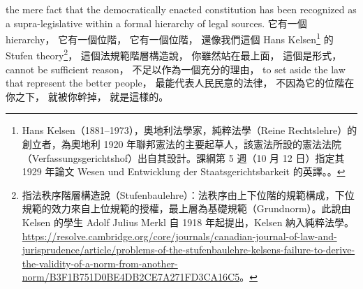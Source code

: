 \hypertarget{w02:cue:1977}{}the mere fact that the democratically enacted constitution has been recognized as a supra-legislative within a formal hierarchy of legal sources.
\hypertarget{w02:cue:1978}{}它有一個 hierarchy，
\hypertarget{w02:cue:1979}{}它有一個位階，
\hypertarget{w02:cue:1980}{}它有一個位階，
\hypertarget{w02:cue:1981}{}還像我們這個 Hans Kelsen\footnote{Hans Kelsen（1881–1973），奧地利法學家，純粹法學（Reine Rechtslehre）的創立者，為奧地利 1920 年聯邦憲法的主要起草人，該憲法所設的憲法法院（Verfassungsgerichtshof）出自其設計。課綱第 5 週（10 月 12 日）指定其 1929 年論文 Wesen und Entwicklung der Staatsgerichtsbarkeit 的英譯。\cite{kelsen2015}。} 的 Stufen theory\footnote{指法秩序階層構造說（Stufenbaulehre）：法秩序由上下位階的規範構成，下位規範的效力來自上位規範的授權，最上層為基礎規範（Grundnorm）。此說由 Kelsen 的學生 Adolf Julius Merkl 自 1918 年起提出，Kelsen 納入純粹法學。\url{https://resolve.cambridge.org/core/journals/canadian-journal-of-law-and-jurisprudence/article/problems-of-the-stufenbaulehre-kelsens-failure-to-derive-the-validity-of-a-norm-from-another-norm/B3F1B751D0BE4DB2CE7A271FD3CA16C5}。}，
\hypertarget{w02:cue:1982}{}這個法規範階層構造說，
\hypertarget{w02:cue:1983}{}你雖然站在最上面，
\hypertarget{w02:cue:1984}{}這個是形式，
\hypertarget{w02:cue:1985}{}cannot be sufficient reason，
\hypertarget{w02:cue:1986}{}不足以作為一個充分的理由，
\hypertarget{w02:cue:1987}{}to set aside the law that represent the better people，
\hypertarget{w02:cue:1988}{}最能代表人民民意的法律，
\hypertarget{w02:cue:1989}{}不因為它的位階在你之下，
\hypertarget{w02:cue:1990}{}就被你幹掉，
\hypertarget{w02:cue:1991}{}就是這樣的。

